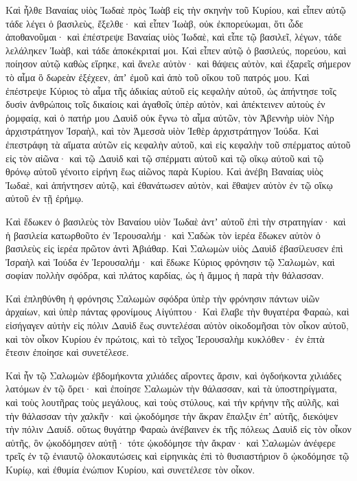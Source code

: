 {\par }{\PP {}Καὶ ἦλθε Βαναίας υἱὸς Ἰωδαὲ πρὸς Ἰωὰβ εἰς τὴν σκηνὴν τοῦ Κυρίου, καὶ εἶπεν αὐτῷ τάδε λέγει ὁ βασιλεὺς, ἔξελθε· καὶ εἶπεν Ἰωὰβ, οὐκ ἐκπορεύωμαι, ὅτι ὧδε ἀποθανοῦμαι· καὶ ἐπέστρεψε Βαναίας υἱὸς Ἰωδαὲ, καὶ εἶπε τῷ βασιλεῖ, λέγων, τάδε λελάληκεν Ἰωὰβ, καὶ τάδε ἀποκέκριταί μοι.
Καὶ εἶπεν αὐτῷ ὁ βασιλεύς, πορεύου, καὶ ποίησον αὐτῷ καθὼς εἴρηκε, καὶ ἄνελε αὐτὸν· καὶ θάψεις αὐτὸν, καὶ ἐξαρεῖς σήμερον τὸ αἷμα ὃ δωρεὰν ἐξέχεεν, ἀπʼ ἐμοῦ καὶ ἀπὸ τοῦ οἴκου τοῦ πατρός μου.
Καὶ ἐπέστρεψε Κύριος τὸ αἷμα τῆς ἀδικίας αὐτοῦ εἰς κεφαλὴν αὐτοῦ, ὡς ἀπήντησε τοῖς δυσὶν ἀνθρώποις τοῖς δικαίοις καὶ ἀγαθοῖς ὑπὲρ αὐτὸν, καὶ ἀπέκτεινεν αὐτοὺς ἐν ῥομφαίᾳ, καὶ ὁ πατήρ μου Δαυὶδ οὐκ ἔγνω τὸ αἷμα αὐτῶν, τὸν Ἀβεννὴρ υἱὸν Νὴρ ἀρχιστράτηγον Ἰσραὴλ, καὶ τὸν Ἀμεσσὰ υἱὸν Ἰεθὲρ ἀρχιστράτηγον Ἰούδα.
Καὶ ἐπεστράφη τὰ αἵματα αὐτῶν εἰς κεφαλὴν αὐτοῦ, καὶ εἰς κεφαλὴν τοῦ σπέρματος αὐτοῦ εἰς τὸν αἰῶνα· καὶ τῷ Δαυὶδ καὶ τῷ σπέρματι αὐτοῦ καὶ τῷ οἴκῳ αὐτοῦ καὶ τῷ θρόνῳ αὐτοῦ γένοιτο εἰρήνη ἕως αἰῶνος παρὰ Κυρίου.
Καὶ ἀνέβη Βαναίας υἱὸς Ἰωδαὲ, καὶ ἀπήντησεν αὐτῷ, καὶ ἐθανάτωσεν αὐτὸν, καὶ ἔθαψεν αὐτὸν ἐν τῷ οἴκῳ αὐτοῦ ἐν τῇ ἐρήμῳ.
\par }{\PP {}Καὶ ἔδωκεν ὁ βασιλεὺς τὸν Βαναίου υἱὸν Ἰωδαὲ ἀντʼ αὐτοῦ ἐπὶ τὴν στρατηγίαν· καὶ ἡ βασιλεία κατωρθοῦτο ἐν Ἰερουσαλήμ· καὶ Σαδὼκ τὸν ἱερέα ἔδωκεν αὐτὸν ὁ βασιλεὺς εἰς ἱερέα πρῶτον ἀντὶ Ἀβιάθαρ. Καὶ Σαλωμὼν υἱὸς Δαυὶδ ἐβασίλευσεν ἐπὶ Ἰσραὴλ καὶ Ἰούδα ἐν Ἱερουσαλήμ·
καὶ ἔδωκε Κύριος φρόνησιν τῷ Σαλωμὼν, καὶ σοφίαν πολλὴν σφόδρα, καὶ πλάτος καρδίας, ὡς ἡ ἄμμος ἡ παρὰ τὴν θάλασσαν.
\par }{\PP {}Καὶ ἐπληθύνθη ἡ φρόνησις Σαλωμὼν σφόδρα ὑπὲρ τὴν φρόνησιν πάντων υἱῶν ἀρχαίων, καὶ ὑπὲρ πάντας φρονίμους Αἰγύπτου·
Καὶ ἔλαβε τὴν θυγατέρα Φαραὼ, καὶ εἰσήγαγεν αὐτὴν εἰς πόλιν Δαυὶδ ἕως συντελέσαι αὐτὸν οἰκοδομῆσαι τὸν οἶκον αὐτοῦ, καὶ τὸν οἶκον Κυρίου ἐν πρώτοις, καὶ τὸ τεῖχος Ἱερουσαλὴμ κυκλόθεν· ἐν ἑπτὰ ἔτεσιν ἐποίησε καὶ συνετέλεσε.
\par }{\PP {}Καὶ ἦν τῷ Σαλωμὼν ἐβδομήκοντα χιλιάδες αἴροντες ἄρσιν, καὶ ὀγδοήκοντα χιλιάδες λατόμων ἐν τῷ ὄρει·
καὶ ἐποίησε Σαλωμὼν τὴν θάλασσαν, καὶ τὰ ὑποστηρίγματα, καὶ τοὺς λουτῆρας τοὺς μεγάλους, καὶ τοὺς στύλους, καὶ τἠν κρήνην τῆς αὐλῆς, καὶ τὴν θάλασσαν τὴν χαλκῆν· καὶ ᾠκοδόμησε τὴν ἄκραν ἔπαλξιν ἐπʼ αὐτῆς, διεκόψεν τὴν πόλιν Δαυίδ.
οὕτως θυγάτηρ Φαραὼ ἀνέβαινεν ἐκ τῆς πόλεως Δαυὶδ εἰς τὸν οἶκον αὐτῆς, ὃν ᾠκοδόμησεν αὐτῇ· τότε ᾠκοδόμησε τὴν ἄκραν·
καὶ Σαλωμὼν ἀνέφερε τρεῖς ἐν τῷ ἐνιαυτῷ ὁλοκαυτώσεις καὶ εἰρηνικὰς ἐπὶ τὸ θυσιαστήριον ὃ ᾠκοδόμησε τῷ Κυρίῳ, καὶ ἐθυμία ἐνώπιον Κυρίου, καὶ συνετέλεσε τὸν οἶκον.
}
